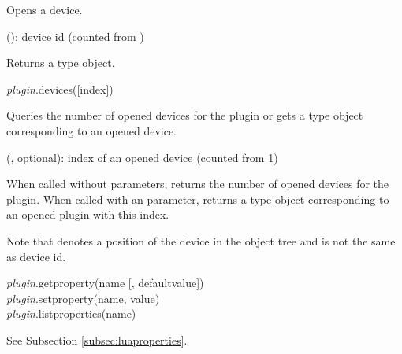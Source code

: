 \documentclass[a4paper,12pt,twoside,extrafontsizes]{memoir}
\begin{document}
\begin{funcdescr}
	Opens a device.
\end{funcdescr}

\begin{funcparams}
	 (): device id (counted from )
\end{funcparams}

\begin{funcret}
	Returns a  type object.
\end{funcret}


\begin{luafuncprototype}
\emph{plugin}.devices([index])
\end{luafuncprototype}

\begin{funcdescr}
	Queries the number of opened devices for the plugin or gets a  type object corresponding to an opened device.
\end{funcdescr}

\begin{funcparams}
	 (, optional): index of an opened device (counted from 1)
\end{funcparams}

\begin{funcret}
	When called without parameters, returns the number of opened devices for the plugin. When called with an  parameter, returns a  type object corresponding to an opened plugin with this index.
\end{funcret}

\begin{funcremarks}
	Note that  denotes a position of the device in the object tree and is not the same as device id.
\end{funcremarks}


\begin{luafuncprototype}
\emph{plugin}.getproperty(name [, defaultvalue])\\
\emph{plugin}.setproperty(name, value)\\
\emph{plugin}.listproperties(name)
\end{luafuncprototype}

\begin{funcdescr}
	See Subsection \ref{subsec:luaproperties}.
\end{funcdescr}
\end{document}
